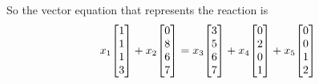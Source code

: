 \documentclass{../mathhomework}
\newenvironment{Mat}{\begin{bmatrix}}{\end{bmatrix}}
\begin{document}
\begin{problem}[1.6\#7]
    So the vector equation that represents the reaction is
    \begin{equation*}
        x_1 \begin{Mat}
            1 \\ 1 \\ 1 \\ 3
        \end{Mat} + x_2 \begin{Mat}
            0 \\ 8 \\ 6 \\ 7
        \end{Mat} = x_3 \begin{Mat}
            3 \\ 5 \\ 6 \\ 7
        \end{Mat} + x_4 \begin{Mat}
            0 \\ 2 \\ 0 \\ 1
        \end{Mat} + x_5 \begin{Mat}
            0 \\ 0 \\ 1 \\ 2
        \end{Mat}
    \end{equation*}


\end{problem}
\end{document}
